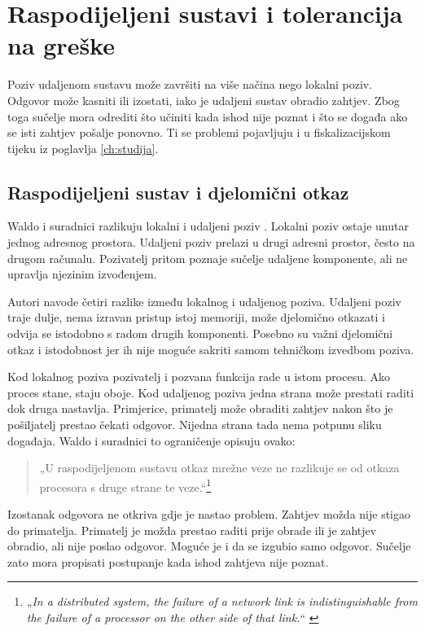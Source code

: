 \section{Raspodijeljeni sustavi i tolerancija na greške}
\label{ch:raspodijeljeni}

Poziv udaljenom sustavu može završiti na više načina nego lokalni poziv.
Odgovor može kasniti ili izostati, iako je udaljeni sustav obradio zahtjev.
Zbog toga sučelje mora odrediti što učiniti kada ishod nije poznat i što se
događa ako se isti zahtjev pošalje ponovno. Ti se problemi pojavljuju i u
fiskalizacijskom tijeku iz poglavlja \ref{ch:studija}.

\subsection{Raspodijeljeni sustav i djelomični otkaz}
\label{sec:djelomicni-otkaz}

Waldo i suradnici razlikuju lokalni i udaljeni poziv
\cite{waldo1994note}. Lokalni poziv ostaje unutar jednog adresnog prostora.
Udaljeni poziv prelazi u drugi adresni prostor, često na drugom računalu.
Pozivatelj pritom poznaje sučelje udaljene komponente, ali ne upravlja njezinim
izvođenjem.

Autori navode četiri razlike između lokalnog i udaljenog poziva. Udaljeni
poziv traje dulje, nema izravan pristup istoj memoriji, može djelomično
otkazati i odvija se istodobno s radom drugih komponenti. Posebno su važni
djelomični otkaz i istodobnost jer ih nije moguće sakriti samom tehničkom
izvedbom poziva.

Kod lokalnog poziva pozivatelj i pozvana funkcija rade u istom procesu. Ako
proces stane, staju oboje. Kod udaljenog poziva jedna strana može prestati
raditi dok druga nastavlja. Primjerice, primatelj može obraditi zahtjev nakon
što je pošiljatelj prestao čekati odgovor. Nijedna strana tada nema potpunu
sliku događaja. Waldo i suradnici to ograničenje opisuju ovako:

\begin{quote}
„U raspodijeljenom sustavu otkaz mrežne veze ne razlikuje se od otkaza
procesora s druge strane te veze.“\footnote{„\emph{In a distributed
system, the failure of a network link is indistinguishable from the
failure of a processor on the other side of that link.}“
\cite{waldo1994note}} \end{quote}

Izostanak odgovora ne otkriva gdje je nastao problem. Zahtjev možda nije
stigao do primatelja. Primatelj je možda prestao raditi prije obrade ili je
zahtjev obradio, ali nije poslao odgovor. Moguće je i da se izgubio samo
odgovor. Sučelje zato mora propisati postupanje kada ishod zahtjeva nije
poznat.

